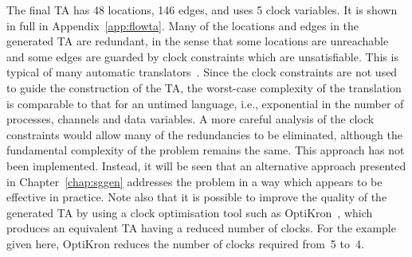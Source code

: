 The final TA has 48 locations, 146 edges, and uses 5 clock
variables. It is shown in full in Appendix~\ref{app:flowta}. Many of
the locations and edges in the generated TA are redundant, in the
sense that some locations are unreachable and some edges are guarded
by clock constraints which are unsatisfiable. This is typical of many
automatic translators~\cite{yov:93,bra:95,her:98}. Since the clock
constraints are not used to guide the construction of the TA, the
worst-case complexity of the translation is comparable to that for an
untimed language, i.e., exponential in the number of processes,
channels and data variables. A more careful analysis of the clock
constraints would allow many of the redundancies to be eliminated,
although the fundamental complexity of the problem remains the
same. This approach has not been implemented. Instead, it will be seen
that an alternative approach presented in Chapter~\ref{chap:sggen}
addresses the problem in a way which appears to be effective in
practice. Note also that it is possible to improve the quality of the
generated TA by using a clock optimisation tool such as
OptiKron~\cite{daw:98a}, which produces an equivalent TA having a
reduced number of clocks. For the example given here, OptiKron reduces
the number of clocks required from~5 to~4.

